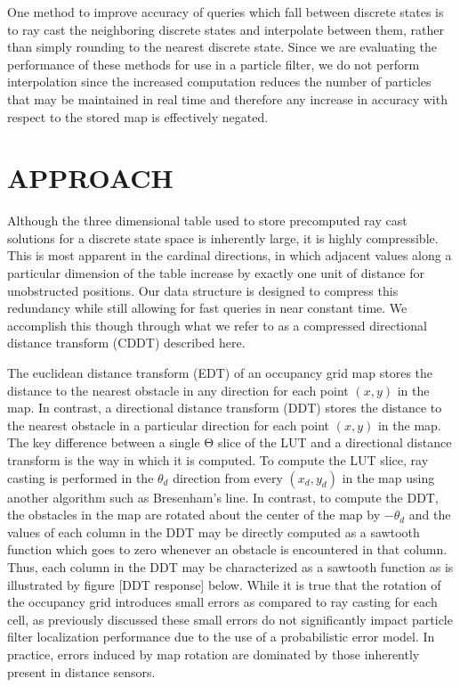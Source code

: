 \documentclass[letterpaper, 10 pt, conference]{ieeeconf}  %
\begin{document}
One method to improve accuracy of queries which fall between discrete states is to ray cast the neighboring discrete states and interpolate between them, rather than simply rounding to the nearest discrete state. Since we are evaluating the performance of these methods for use in a particle filter, we do not perform interpolation since the increased computation reduces the number of particles that may be maintained in real time and therefore any increase in accuracy with respect to the stored map is effectively negated.

\section{APPROACH}

Although the three dimensional table used to store precomputed ray cast solutions for a discrete state space is inherently large, it is highly compressible. This is most apparent in the cardinal directions, in which adjacent values along a particular dimension of the table increase by exactly one unit of distance for unobstructed positions. Our data structure is designed to compress this redundancy while still allowing for fast queries in near constant time. We accomplish this though through what we refer to as a compressed directional distance transform (CDDT) described here.

The euclidean distance transform (EDT) of an occupancy grid map stores the distance to the nearest obstacle in any direction for each point $(x,y)$ in the map. In contrast, a directional distance transform (DDT) stores the distance to the nearest obstacle in a particular direction for each point $(x,y)$ in the map. The key difference between a single Θ slice of the LUT and a directional distance transform is the way in which it is computed. To compute the LUT slice, ray casting is performed in the $\theta_d$ direction from every $(x_d,y_d)$ in the map using another algorithm such as Bresenham’s line. In contrast, to compute the DDT, the obstacles in the map are rotated about the center of the map by $-\theta_d$ and the values of each column in the DDT may be directly computed as a sawtooth function which goes to zero whenever an obstacle is encountered in that column. Thus, each column in the DDT may be characterized as a sawtooth function as is illustrated by figure [DDT response] below. While it is true that the rotation of the occupancy grid introduces small errors as compared to ray casting for each cell, as previously discussed these small errors do not significantly impact particle filter localization performance due to the use of a probabilistic error model. In practice, errors induced by map rotation are dominated by those inherently present in distance sensors.
\end{document}
